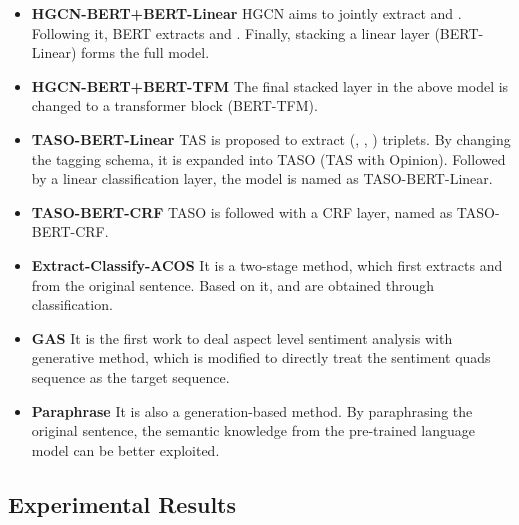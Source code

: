 \documentclass[11pt]{article}
\begin{document}
\noindent
\begin{itemize}[leftmargin=*]
\item \textbf{HGCN-BERT+BERT-Linear} \; HGCN \cite{cai2020aspect} aims to jointly extract  and . Following it, BERT extracts  and  \cite{li-etal-2019-exploiting}. Finally, stacking a linear layer (BERT-Linear) forms the full model.
\item \textbf{HGCN-BERT+BERT-TFM} \; The final stacked layer in the above model is changed to a transformer block (BERT-TFM).
\item \textbf{TASO-BERT-Linear} \; TAS \cite{wan2020target} is proposed to extract (, , ) triplets. By changing the tagging schema, it is expanded into TASO (TAS with Opinion). Followed by a linear classification layer, the model is named as TASO-BERT-Linear.
\item \textbf{TASO-BERT-CRF} \; TASO is followed with a CRF layer, named as TASO-BERT-CRF.
\item \textbf{Extract-Classify-ACOS} \cite{cai2021aspect} \; It is a two-stage method, which first extracts  and  from the original sentence. Based on it,  and  are obtained through classification. 
\item \textbf{GAS} \cite{zhang-etal-2021-towards-generative} \; It is the first work to deal aspect level sentiment analysis with generative method, which is modified to directly treat the sentiment quads sequence as the target sequence.
\item \textbf{Paraphrase} \cite{zhang-etal-2021-aspect-sentiment} \; It is also a generation-based method. By paraphrasing the original sentence, the semantic knowledge from the pre-trained language model can be better exploited.
\end{itemize}
















\subsection{Experimental Results}
\end{document}
